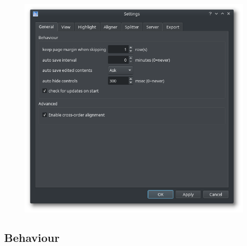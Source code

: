 \documentclass[a4paper,10pt,oneside]{book}
\begin{document}
\begin{figure}[htb]
 \includegraphics[width=\textwidth]{screenshots/settings_general.png}
\end{figure}

\subsection*{Behaviour}
\end{document}
